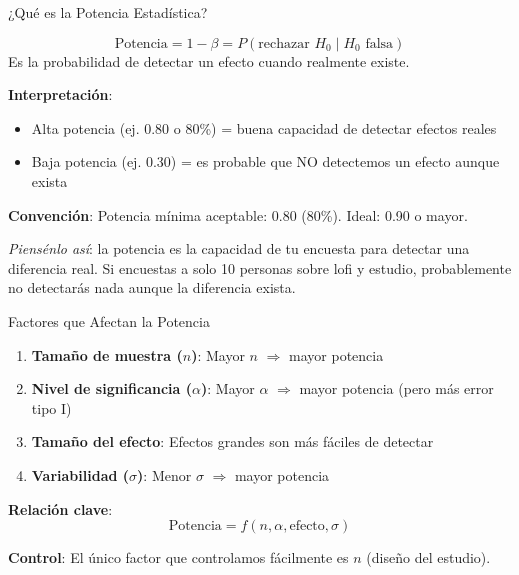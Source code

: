 \documentclass[aspectratio=169, 11pt]{beamer}
\begin{document}
\begin{frame}{¿Qué es la Potencia Estadística?}
\begin{definition}
\[
\text{Potencia} = 1 - \beta = P(\text{rechazar } H_0 \mid H_0 \text{ falsa})
\]
Es la probabilidad de \alert{detectar} un efecto cuando realmente existe.
\end{definition}

\vspace{0.2cm}
\textbf{Interpretación}:
\begin{itemize}
  \item Alta potencia (ej. 0.80 o 80\%) = buena capacidad de detectar efectos reales
  \item Baja potencia (ej. 0.30) = es probable que NO detectemos un efecto aunque exista
\end{itemize}

\vspace{0.2cm}
\textbf{Convención}: Potencia m\'inima aceptable: 0.80 (80\%). Ideal: 0.90 o mayor.

\smallskip
\textit{Piens\'enlo as\'i}: la potencia es la capacidad de tu encuesta para detectar una diferencia real. Si encuestas a solo 10 personas sobre lofi y estudio, probablemente no detectar\'as nada aunque la diferencia exista.
\end{frame}

\begin{frame}{Factores que Afectan la Potencia}
\begin{enumerate}
  \item \textbf{Tamaño de muestra ($n$)}: Mayor $n$ $\Rightarrow$ mayor potencia

  \item \textbf{Nivel de significancia ($\alpha$)}: Mayor $\alpha$ $\Rightarrow$ mayor potencia (pero más error tipo I)

  \item \textbf{Tamaño del efecto}: Efectos grandes son más fáciles de detectar

  \item \textbf{Variabilidad ($\sigma$)}: Menor $\sigma$ $\Rightarrow$ mayor potencia
\end{enumerate}

\vspace{0.3cm}
\textbf{Relación clave}:
\[
\text{Potencia} = f(n, \alpha, \text{efecto}, \sigma)
\]

\vspace{0.3cm}
\textbf{Control}: El único factor que controlamos fácilmente es $n$ (diseño del estudio).
\end{frame}
\end{document}
